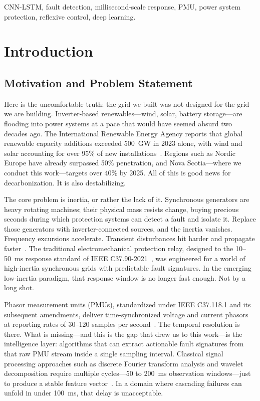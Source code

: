 \documentclass[journal]{IEEEtran}
\begin{document}
\begin{IEEEkeywords}
CNN-LSTM, fault detection, millisecond-scale response, PMU, power system protection, reflexive control, deep learning.
\end{IEEEkeywords}

\section{Introduction}
\label{sec:intro}

\subsection{Motivation and Problem Statement}

Here is the uncomfortable truth: the grid we built was not designed for the grid we are building. Inverter-based renewables---wind, solar, battery storage---are flooding into power systems at a pace that would have seemed absurd two decades ago. The International Renewable Energy Agency reports that global renewable capacity additions exceeded 500~GW in 2023 alone, with wind and solar accounting for over 95\% of new installations~\cite{ref1}. Regions such as Nordic Europe have already surpassed 50\% penetration, and Nova Scotia---where we conduct this work---targets over 40\% by 2025. All of this is good news for decarbonization. It is also destabilizing.

The core problem is inertia, or rather the lack of it. Synchronous generators are heavy rotating machines; their physical mass resists change, buying precious seconds during which protection systems can detect a fault and isolate it. Replace those generators with inverter-connected sources, and the inertia vanishes. Frequency excursions accelerate. Transient disturbances hit harder and propagate faster~\cite{ref2}. The traditional electromechanical protection relay, designed to the 10--50~ms response standard of IEEE C37.90-2021~\cite{ref3}, was engineered for a world of high-inertia synchronous grids with predictable fault signatures. In the emerging low-inertia paradigm, that response window is no longer fast enough. Not by a long shot.

Phasor measurement units (PMUs), standardized under IEEE C37.118.1 and its subsequent amendments, deliver time-synchronized voltage and current phasors at reporting rates of 30--120 samples per second~\cite{ref4}. The temporal resolution is there. What is missing---and this is the gap that drew us to this work---is the intelligence layer: algorithms that can extract actionable fault signatures from that raw PMU stream inside a single sampling interval. Classical signal processing approaches such as discrete Fourier transform analysis and wavelet decomposition require multiple cycles---50 to 200~ms observation windows---just to produce a stable feature vector~\cite{ref5}. In a domain where cascading failures can unfold in under 100~ms, that delay is unacceptable.
\end{document}
